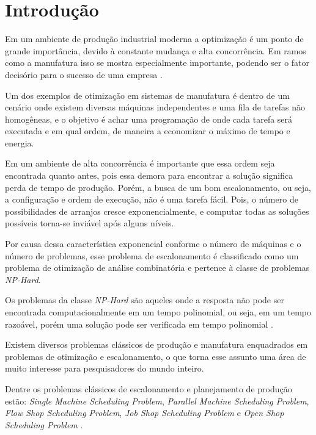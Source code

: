 \chapter{Introdução}
    Em um ambiente de produção industrial moderna a optimização é um ponto de grande importância, devido à constante mudança e alta concorrência. Em ramos como a manufatura isso se mostra especialmente importante, podendo ser o fator decisório para o sucesso de uma empresa \cite{Wari2016}.\newline
    
    Um dos exemplos de otimização em sistemas de manufatura é dentro de um cenário onde existem diversas máquinas independentes e uma fila de tarefas não homogêneas, e o objetivo é achar uma programação de onde cada tarefa será executada e em qual ordem, de maneira a economizar o máximo de tempo e energia.\newline

    Em um ambiente de alta concorrência é importante que essa ordem seja encontrada quanto antes, pois essa demora para encontrar a solução significa perda de tempo de produção. Porém, a busca de um bom escalonamento, ou seja, a configuração e ordem de execução, não é uma tarefa fácil. Pois, o número de possibilidades de arranjos cresce exponencialmente, e computar todas as soluções possíveis torna-se inviável após alguns níveis.\newline

    Por causa dessa característica exponencial conforme o número de máquinas e o número de problemas, esse problema de escalonamento é classificado como um problema de otimização de análise combinatória e pertence à classe de problemas \textit{NP-Hard}.\newline

    Os problemas da classe \textit{NP-Hard} são aqueles onde a resposta não pode ser encontrada computacionalmente em um tempo polinomial, ou seja, em um tempo razoável, porém uma solução pode ser verificada em tempo polinomial \cite{Eswaramurthy2008}.\newline

    Existem diversos problemas clássicos de produção e manufatura enquadrados em problemas de otimização e escalonamento, o que torna esse assunto uma área de muito interesse para pesquisadores do mundo inteiro.\newline

    Dentre os problemas clássicos de escalonamento e planejamento de produção estão: 
    \textit{Single Machine Scheduling Problem}, 
    \textit{Parallel Machine Scheduling Problem}, 
    \textit{Flow Shop Scheduling Problem}, 
    \textit{Job Shop Scheduling Problem} e 
    \textit{Open Shop Scheduling Problem} 
    \cite{Allahverdi2008}.\newline


